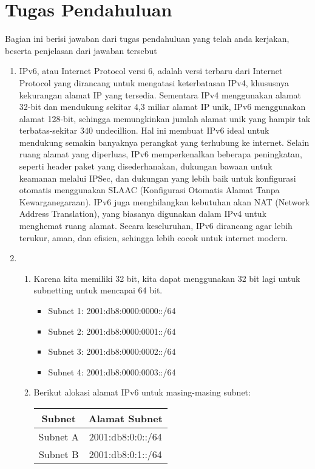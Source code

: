 \section{Tugas Pendahuluan}
Bagian ini berisi jawaban dari tugas pendahuluan yang telah anda kerjakan, beserta penjelasan dari jawaban tersebut
\begin{enumerate}
	\item IPv6, atau Internet Protocol versi 6, adalah versi 
	terbaru dari Internet Protocol yang dirancang untuk 
	mengatasi keterbatasan IPv4, khususnya kekurangan alamat IP 
	yang tersedia. Sementara IPv4 menggunakan alamat 32-bit dan 
	mendukung sekitar 4,3 miliar alamat IP unik, IPv6 
	menggunakan alamat 128-bit, sehingga memungkinkan jumlah 
	alamat unik yang hampir tak terbatas-sekitar 340 undecillion. 
	Hal ini membuat IPv6 ideal untuk mendukung semakin banyaknya 
	perangkat yang terhubung ke internet. Selain ruang alamat 
	yang diperluas, IPv6 memperkenalkan beberapa peningkatan, 
	seperti header paket yang disederhanakan, dukungan bawaan 
	untuk keamanan melalui IPSec, dan dukungan yang lebih baik 
	untuk konfigurasi otomatis menggunakan SLAAC (Konfigurasi 
	Otomatis Alamat Tanpa Kewarganegaraan). IPv6 juga 
	menghilangkan kebutuhan akan NAT (Network Address 
	Translation), yang biasanya digunakan dalam IPv4 untuk 
	menghemat ruang alamat. Secara keseluruhan, IPv6 dirancang 
	agar lebih terukur, aman, dan efisien, sehingga lebih cocok 
	untuk internet modern.
	\item \begin{enumerate}
		\item Karena kita memiliki 32 bit, kita dapat menggunakan 
		32 bit lagi untuk subnetting untuk mencapai 64 bit.
		\begin{itemize}
			\item Subnet 1: 2001:db8:0000:0000::/64
			\item Subnet 2: 2001:db8:0000:0001::/64
			\item Subnet 3: 2001:db8:0000:0002::/64
			\item Subnet 4: 2001:db8:0000:0003::/64
		\end{itemize}
		\item Berikut alokasi alamat IPv6 untuk masing-masing 
		subnet:
		{\small
		\begin{center}
		\begin{tabular}{ |c|c| } 
			\hline
			Subnet & Alamat Subnet  \\
			\hline
			Subnet A & 2001:db8:0:0::/64\\
			Subnet B & 2001:db8:0:1::/64 \\

\end{tabular}
\end{center}}
\end{enumerate}
\end{enumerate}

